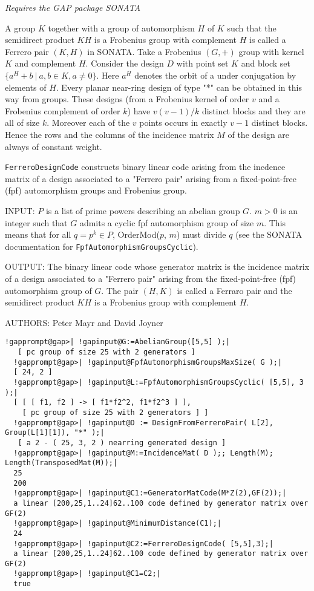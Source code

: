 \documentclass[a4paper,11pt]{report}
\begin{document}
{{{ \emph{Requires the GAP package SONATA} 

 A group $K$ together with a group of automorphism $H$ of $K$ such that the semidirect product $KH$ is a Frobenius group with complement $H$ is called a Ferrero pair $(K, H)$ in SONATA. Take a Frobenius $(G,+)$ group with kernel $K$ and complement $H$. Consider the design $D$ with point set $K$ and block set $\{ a^H + b\ |\ a, b \in K, a \not= 0 \}$. Here $a^H$ denotes the orbit of a under conjugation by elements of $H$. Every planar near-ring design of type "*" can be obtained in this way from
groups. These designs (from a Frobenius kernel of order $v$ and a Frobenius complement of order $k$) have $v(v-1)/k$ distinct blocks and they are all of size $k$. Moreover each of the $v$ points occurs in exactly $v-1$ distinct blocks. Hence the rows and the columns of the incidence matrix $M$ of the design are always of constant weight. 

 \texttt{FerreroDesignCode} constructs binary linear code arising from the incdence matrix of a design
associated to a "Ferrero pair" arising from a fixed-point-free (fpf)
automorphism groups and Frobenius group. 

 INPUT: $P$ is a list of prime powers describing an abelian group $G$. $m > 0$ is an integer such that $G$ admits a cyclic fpf automorphism group of size $m$. This means that for all $q = p^k \in P$, OrderMod($p$, $m$) must divide $q$ (see the SONATA documentation for \texttt{FpfAutomorphismGroupsCyclic}). 

 OUTPUT: The binary linear code whose generator matrix is the incidence matrix
of a design associated to a "Ferrero pair" arising from the fixed-point-free
(fpf) automorphism group of $G$. The pair $(H,K)$ is called a Ferraro pair and the semidirect product $KH$ is a Frobenius group with complement $H$. 

 AUTHORS: Peter Mayr and David Joyner }

 
\begin{Verbatim}[commandchars=!@|,fontsize=\small,frame=single,label=Example]
  !gapprompt@gap>| !gapinput@G:=AbelianGroup([5,5] );|
   [ pc group of size 25 with 2 generators ]
  !gapprompt@gap>| !gapinput@FpfAutomorphismGroupsMaxSize( G );|
  [ 24, 2 ]
  !gapprompt@gap>| !gapinput@L:=FpfAutomorphismGroupsCyclic( [5,5], 3 );|
  [ [ [ f1, f2 ] -> [ f1*f2^2, f1*f2^3 ] ],
    [ pc group of size 25 with 2 generators ] ]
  !gapprompt@gap>| !gapinput@D := DesignFromFerreroPair( L[2], Group(L[1][1]), "*" );|
   [ a 2 - ( 25, 3, 2 ) nearring generated design ]
  !gapprompt@gap>| !gapinput@M:=IncidenceMat( D );; Length(M); Length(TransposedMat(M));|
  25
  200
  !gapprompt@gap>| !gapinput@C1:=GeneratorMatCode(M*Z(2),GF(2));|
  a linear [200,25,1..24]62..100 code defined by generator matrix over GF(2)
  !gapprompt@gap>| !gapinput@MinimumDistance(C1);|
  24
  !gapprompt@gap>| !gapinput@C2:=FerreroDesignCode( [5,5],3);|
  a linear [200,25,1..24]62..100 code defined by generator matrix over GF(2)
  !gapprompt@gap>| !gapinput@C1=C2;|
  true
  

\end{Verbatim}}}
\end{document}
